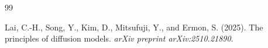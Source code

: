 \documentclass{scrartcl}
\begin{document}
\begin{thebibliography}{99}

Lai, C.-H., Song, Y., Kim, D., Mitsufuji, Y., and Ermon, S. (2025).
\newblock The principles of diffusion models.
\newblock \emph{arXiv preprint arXiv:2510.21890}.




  



  


  
 

\end{thebibliography}
\end{document}
